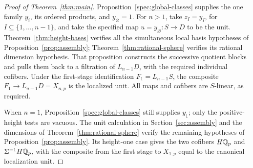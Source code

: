 \begin{proof}[Proof of Theorem~\ref{thm:main}]
Proposition~\ref{spec:global-classes} supplies the one family
\(y_i\), its ordered products, and \(y_\varnothing=1\).
For \(n>1\), take \(z_I=y_I\), for
\(I\subseteq\{1,\ldots,n-1\}\), and take the specified map
\(u=y_\varnothing:S\to D\) to be the unit.
Theorem~\ref{thm:height-bases} verifies
all the simultaneous local basis hypotheses of
Proposition~\ref{prop:assembly};
Theorem~\ref{thm:rational-sphere} verifies its rational dimension
hypothesis. That proposition constructs the successive quotient
blocks and pulls them back to a filtration of \(L_{n-1}D\), with
the required individual cofibers. Under the first-stage identification
\(F_1=L_{n-1}S\), the composite \(F_1\to L_{n-1}D=X_{n,p}\) is the
localized unit. All maps and cofibers are \(S\)-linear, as required.

When \(n=1\), Proposition~\ref{spec:global-classes} still supplies
\(y_1\); only the positive-height tests are vacuous.
The unit calculation in Section~\ref{sec:assembly} and the dimensions
of Theorem~\ref{thm:rational-sphere} verify the remaining hypotheses
of Proposition~\ref{prop:assembly}. Its height-one case gives the
two cofibers \(H\mathbb Q_p\) and \(\Sigma^{-1}H\mathbb Q_p\), with the composite
from the first stage to \(X_{1,p}\) equal to the canonical localization unit.
\end{proof}
